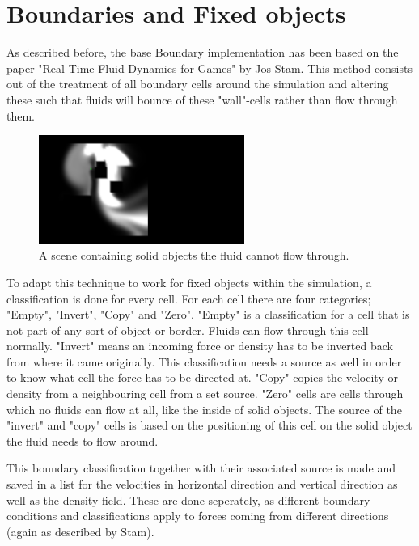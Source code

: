 \chapter{Boundaries and Fixed objects}
\label{chap:BoundariesAndFixedObjects}

As described before, the base Boundary implementation has been based on the paper "Real-Time Fluid Dynamics for Games" by Jos Stam. This method consists out of the treatment of all boundary cells around the simulation and altering these such that fluids will bounce of these "wall"-cells rather than flow through them.

\begin{figure}[htb!]
    \centering
    \includegraphics[width=0.6\textwidth]{images/FixedObject}
    \caption{A scene containing solid objects the fluid cannot flow through.}
    \label{fig:Fixed_object}
\end{figure}

To adapt this technique to work for fixed objects within the simulation, a classification is done for every cell. For each cell there are four categories; "Empty", "Invert", "Copy" and "Zero". "Empty" is a classification for a cell that is not part of any sort of object or border. Fluids can flow through this cell normally. "Invert" means an incoming force or density has to be inverted back from where it came originally. This classification needs a source as well in order to know what cell the force has to be directed at. "Copy" copies the velocity or density from a neighbouring cell from a set source. "Zero" cells are cells through which no fluids can flow at all, like the inside of solid objects. The source of the "invert" and "copy" cells is based on the positioning of this cell on the solid object the fluid needs to flow around.

This boundary classification together with their associated source is made and saved in a list for the velocities in horizontal direction and vertical direction as well as the density field. These are done seperately, as different boundary conditions and classifications apply to forces coming from different directions (again as described by Stam).
